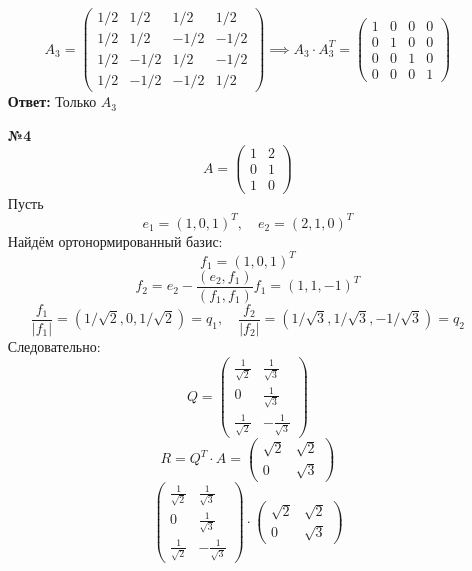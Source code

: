 \documentclass[a4paper]{article}
\newcommand{\mat}[1]{\begin{pmatrix} #1 \end{pmatrix}}
\renewcommand{\f}[2]{\frac{#1}{#2}}
\begin{document}
\begin{enumerate}
    $$A_3 = \begin{pmatrix}
        1/2 & 1/2 & 1/2 & 1/2 \\
        1/2 & 1/2 & -1/2 & -1/2 \\
        1/2 & -1/2 & 1/2 & -1/2 \\
        1/2 & -1/2 & -1/2 & 1/2
        \end{pmatrix}\implies A_3 \cdot A_3^T = \begin{pmatrix}
        1 & 0 & 0 & 0 \\
        0 & 1 & 0 & 0 \\
        0 & 0 & 1 & 0 \\
        0 & 0 & 0 & 1
        \end{pmatrix}$$
    \textbf{Ответ:} Только $A_3$

    \item[\textbf{№4}]
    $$A = \mat{1 & 2\\ 0 & 1 \\ 1 & 0}$$
    Пусть 
    $$e_1 = (1, 0, 1)^T, \quad e_2 = (2, 1, 0)^T$$
    Найдём ортонормированный базис:
    $$f_1 = (1, 0, 1)^T$$
    $$f_2 = e_2 - \f{(e_2, f_1)}{(f_1, f_1)}f_1 = (1, 1, -1)^T$$
    $$\f{f_1}{|f_1|} = (1/\sqrt{2}, 0, 1/\sqrt{2}) = q_1, \quad 
    \f{f_2}{|f_2|} = (1/\sqrt{3}, 1/\sqrt{3}, -1/\sqrt{3}) = q_2$$
    Следовательно:
    $$Q = \mat{
        \f{1}{\sqrt{2}} & \f{1}{\sqrt{3}}\\
        0 & \f{1}{\sqrt{3}}\\
        \f{1}{\sqrt{2}} & -\f{1}{\sqrt{3}}
    }$$
    $$R = Q^T\cdot A = \mat{\sqrt{2} & \sqrt{2} \\ 0 & \sqrt{3}}$$
    $$ \mat{
        \f{1}{\sqrt{2}} & \f{1}{\sqrt{3}}\\
        0 & \f{1}{\sqrt{3}}\\
        \f{1}{\sqrt{2}} & -\f{1}{\sqrt{3}}
    } \cdot \mat{\sqrt{2} & \sqrt{2} \\ 0 & \sqrt{3}}$$


\end{enumerate}
\end{document}
